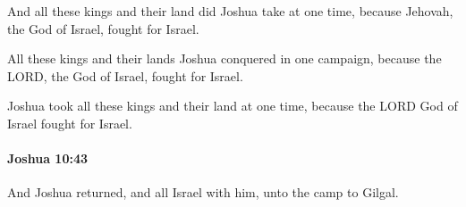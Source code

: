 			\begin{versebox}
					\item[BHS] 
					\item[ASV] And all these kings and their land did Joshua take at one time, because Jehovah, the God of Israel, fought for Israel.
					\item[NIV] All these kings and their lands Joshua conquered in one campaign, because the LORD, the God of Israel, fought for Israel.
					\item[NRSV] Joshua took all these kings and their land at one time, because the LORD God of Israel fought for Israel.
			\end{versebox}

		\paragraph{Joshua 10:43} %
			\label{JOSHUA-10-43}

			And Joshua returned, and all Israel with him, unto the camp to Gilgal.

